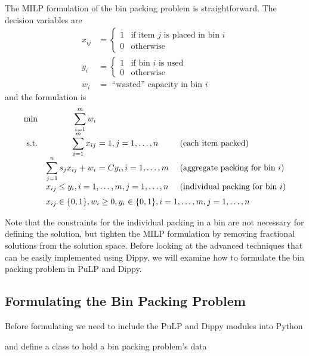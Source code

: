 The \ac{MILP} formulation of the bin packing problem is straightforward.
The decision variables are
\begin{align*}
x_{ij} &= \begin{cases} 1 & \text{if item $j$ is placed in bin $i$} \\
0 & \text{otherwise} \end{cases} \\
y_i &= \begin{cases} 1 & \text{if bin $i$ is used} \\
0 & \text{otherwise} \end{cases} \\
w_i &= \text{ ``wasted'' capacity in bin $i$}
\end{align*}
and the formulation is
\[
\begin{array}{rr@{\ }ll}
       \min & \displaystyle \sum_{i=1}^m w_i \\
\text{s.t.} & \displaystyle \sum_{i=1}^m x_{ij}           & = 1, j = 1, \ldots, n      & \text{ (each item packed)} \\
            & \displaystyle \sum_{j=1}^n s_j x_{ij} + w_i & = C y_i, i = 1, \ldots, m  & \text{ (aggregate packing for bin $i$)} \\
            & \multicolumn{2}{l}{x_{ij} \leq y_i, i = 1, \ldots, m, j = 1, \ldots, n}  & \text{ (individual packing for bin $i$)} \\[6pt]
            & \multicolumn{3}{l}{x_{ij} \in \{ 0, 1\}, w_i \geq 0, y_i \in \{0, 1\}, i = 1, \ldots, m, j = 1, \ldots, n}
\end{array}
\]

Note that the constraints for the individual packing in a bin are not necessary for defining the solution, but tighten the \ac{MILP} formulation by removing fractional solutions from the solution space. Before looking at the advanced techniques that can be easily implemented using Dippy, we will examine how to formulate the bin packing problem in PuLP and Dippy.

\subsection{Formulating the Bin Packing Problem} \label{sbs:formulate}

Before formulating we need to include the PuLP and Dippy modules into Python

and define a class to hold a bin packing problem's data


